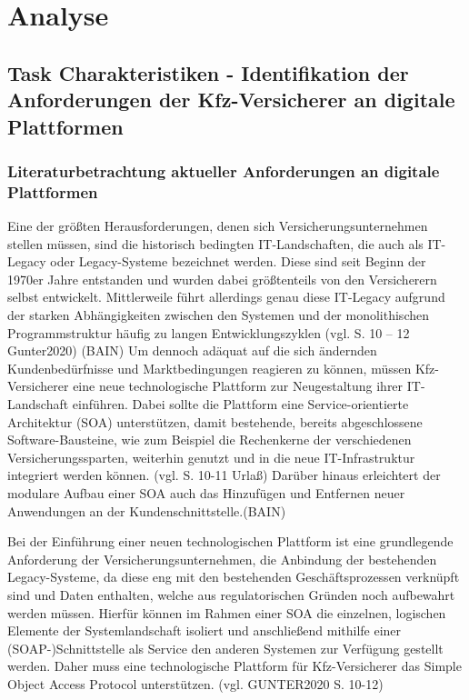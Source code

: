 \chapter{Analyse}
\section{Task Charakteristiken - Identifikation der Anforderungen der Kfz-Versicherer an digitale Plattformen}

\subsection{Literaturbetrachtung aktueller Anforderungen an digitale Plattformen}

Eine der größten Herausforderungen, denen sich Versicherungsunternehmen stellen müssen, sind die historisch bedingten IT-Landschaften, die auch als IT-Legacy oder Legacy-Systeme bezeichnet werden. Diese sind seit Beginn der 1970er Jahre entstanden und wurden dabei größtenteils von den Versicherern selbst entwickelt. Mittlerweile führt allerdings genau diese IT-Legacy aufgrund der starken Abhängigkeiten zwischen den Systemen und der monolithischen Programmstruktur häufig zu langen Entwicklungszyklen (vgl. S. 10 – 12 Gunter2020) (BAIN) Um dennoch adäquat auf die sich ändernden Kundenbedürfnisse und Marktbedingungen reagieren zu können, müssen Kfz-Versicherer eine neue technologische Plattform zur Neugestaltung ihrer IT-Landschaft einführen. Dabei sollte die Plattform eine Service-orientierte Architektur (SOA) unterstützen, damit bestehende, bereits abgeschlossene Software-Bausteine, wie zum Beispiel die Rechenkerne der verschiedenen Versicherungssparten, weiterhin genutzt und in die neue IT-Infrastruktur integriert werden können. (vgl. S. 10-11 Urlaß) Darüber hinaus erleichtert der modulare Aufbau einer SOA auch das Hinzufügen und Entfernen neuer Anwendungen an der Kundenschnittstelle.(BAIN)

Bei der Einführung einer neuen technologischen Plattform ist eine grundlegende Anforderung der Versicherungsunternehmen, die Anbindung der bestehenden Legacy-Systeme, da diese eng mit den bestehenden Geschäftsprozessen verknüpft sind und Daten enthalten, welche aus regulatorischen Gründen noch aufbewahrt werden müssen. Hierfür können im Rahmen einer SOA die einzelnen, logischen Elemente der Systemlandschaft isoliert und anschließend mithilfe einer (SOAP-)Schnittstelle als Service den anderen Systemen zur Verfügung gestellt werden. Daher muss eine technologische Plattform für Kfz-Versicherer das Simple Object Access Protocol unterstützen. (vgl. GUNTER2020 S. 10-12)

